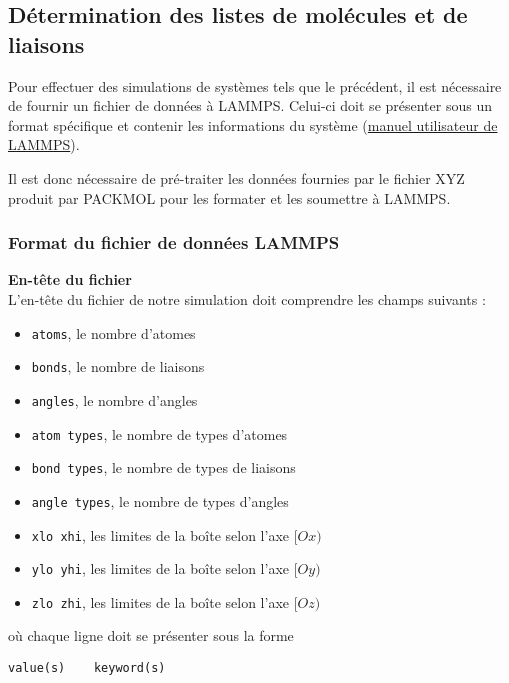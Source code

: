     \subsection{Détermination des listes de molécules et de liaisons}

Pour effectuer des simulations de systèmes tels que le précédent, il est nécessaire de fournir un fichier de données à LAMMPS. Celui-ci doit se présenter sous un format spécifique et contenir les informations du système (\href{https://docs.lammps.org/read_data.html#format-of-a-data-file}{manuel utilisateur de LAMMPS}).

Il est donc nécessaire de pré-traiter les données fournies par le fichier XYZ produit par PACKMOL pour les formater et les soumettre à LAMMPS.

	\subsubsection{Format du fichier de données LAMMPS}

\textbf{En-tête du fichier}\\
L'en-tête du fichier de notre simulation doit comprendre les champs suivants :
\begin{itemize}
	\item \lstinline!atoms!, le nombre d'atomes
	\item \lstinline!bonds!, le nombre de liaisons
	\item \lstinline!angles!, le nombre d'angles
	\item \lstinline!atom types!, le nombre de types d'atomes
	\item \lstinline!bond types!, le nombre de types de liaisons
	\item \lstinline!angle types!, le nombre de types d'angles
	\item \lstinline!xlo xhi!, les limites de la boîte selon l'axe $[Ox)$
	\item \lstinline!ylo yhi!, les limites de la boîte selon l'axe $[Oy)$
	\item \lstinline!zlo zhi!, les limites de la boîte selon l'axe $[Oz)$
\end{itemize}
où chaque ligne doit se présenter sous la forme
\begin{lstlisting}
value(s)	keyword(s)
\end{lstlisting}

